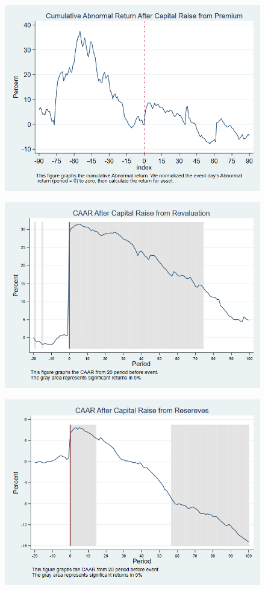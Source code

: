 \documentclass[12pt]{article}
\begin{document}
\begin{figure}
\centering
\includegraphics[width=0.7\linewidth]{AbReturnPremium}
\caption{}
\label{fig:abreturnpremium}
\end{figure}
\begin{figure}
\centering
\includegraphics[width=0.7\linewidth]{AbReturnRevalution}
\caption{}
\label{fig:abreturnrevalution}
\end{figure}
\begin{figure}
\centering
\includegraphics[width=0.7\linewidth]{AbReturnSaving}
\caption{}
\label{fig:abreturnsaving}
\end{figure}
\end{document}
